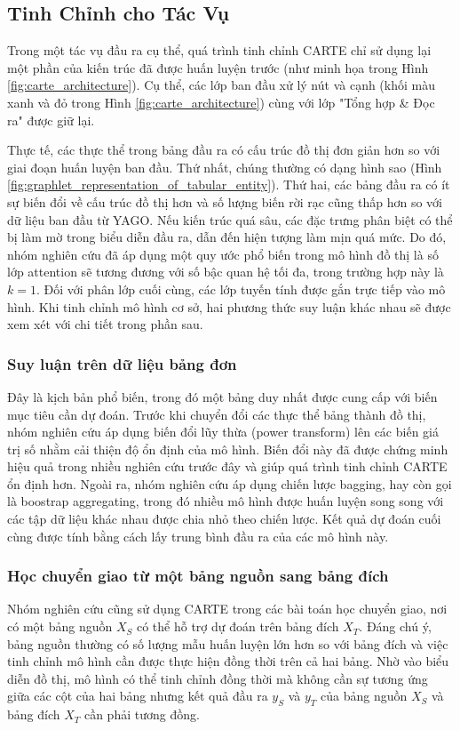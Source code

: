 \documentclass{article}
\begin{document}
\subsection{Tinh Chỉnh cho Tác Vụ}
Trong một tác vụ đầu ra cụ thể, quá trình tinh chỉnh CARTE chỉ sử dụng lại một phần của kiến trúc đã được huấn luyện trước (như minh họa trong Hình \ref{fig:carte_architecture}). Cụ thể, các lớp ban đầu xử lý nút và cạnh (khối màu xanh và đỏ trong Hình \ref{fig:carte_architecture}) cùng với lớp "Tổng hợp \& Đọc ra" được giữ lại.

Thực tế, các thực thể trong bảng đầu ra có cấu trúc đồ thị đơn giản hơn so với giai đoạn huấn luyện ban đầu. Thứ nhất, chúng thường có dạng hình sao (Hình \ref{fig:graphlet_representation_of_tabular_entity}). Thứ hai, các bảng đầu ra có ít sự biến đổi về cấu trúc đồ thị hơn và số lượng biến rời rạc cũng thấp hơn so với dữ liệu ban đầu từ YAGO. Nếu kiến trúc quá sâu, các đặc trưng phân biệt có thể bị làm mờ trong biểu diễn đầu ra, dẫn đến hiện tượng làm mịn quá mức. Do đó, nhóm nghiên cứu đã áp dụng một quy ước phổ biến trong mô hình đồ thị là số lớp attention sẽ tương đương với số bậc quan hệ tối đa, trong trường hợp này là $k=1$. Đối với phân lớp cuối cùng, các lớp tuyến tính được gắn trực tiếp vào mô hình. Khi tinh chỉnh mô hình cơ sở, hai phương thức suy luận khác nhau sẽ được xem xét với chi tiết trong phần sau.

\subsubsection{Suy luận trên dữ liệu bảng đơn}
Đây là kịch bản phổ biến, trong đó một bảng duy nhất được cung cấp với biến mục tiêu cần dự đoán. Trước khi chuyển đổi các thực thể bảng thành đồ thị, nhóm nghiên cứu áp dụng biến đổi lũy thừa (power transform) lên các biến giá trị số nhằm cải thiện độ ổn định của mô hình. Biến đổi này đã được chứng minh hiệu quả trong nhiều nghiên cứu trước đây và giúp quá trình tinh chỉnh CARTE ổn định hơn. Ngoài ra, nhóm nghiên cứu áp dụng chiến lược bagging, hay còn gọi là boostrap aggregating, trong đó nhiều mô hình được huấn luyện song song với các tập dữ liệu khác nhau được chia nhỏ theo chiến lược. Kết quả dự đoán cuối cùng được tính bằng cách lấy trung bình đầu ra của các mô hình này.

\subsubsection{Học chuyển giao từ một bảng nguồn sang bảng đích}
Nhóm nghiên cứu cũng sử dụng CARTE trong các bài toán học chuyển giao, nơi có một bảng nguồn $X_S$ có thể hỗ trợ dự đoán trên bảng đích $X_T$. Đáng chú ý, bảng nguồn thường có số lượng mẫu huấn luyện lớn hơn so với bảng đích và việc tinh chỉnh mô hình cần được thực hiện đồng thời trên cả hai bảng. Nhờ vào biểu diễn đồ thị, mô hình có thể tinh chỉnh đồng thời mà không cần sự tương ứng giữa các cột của hai bảng nhưng kết quả đầu ra $y_S$ và $y_T$ của bảng nguồn $X_S$ và bảng đích $X_T$ cần phải tương đồng.
\end{document}
